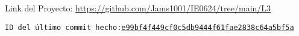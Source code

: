 \begin{abstract}



\end{abstract}

Link del Proyecto: \faGithub   \hspace{0.5mm}\url{https://github.com/Jams1001/IE0624/tree/main/L3} 

\texttt{ID del último commit hecho:\href{https://github.com/Jams1001/IE0624/commit/e99bf4f449cf0c5db9444f61fae2838c64a5bf5a}{e99bf4f449cf0c5db9444f61fae2838c64a5bf5a}}
